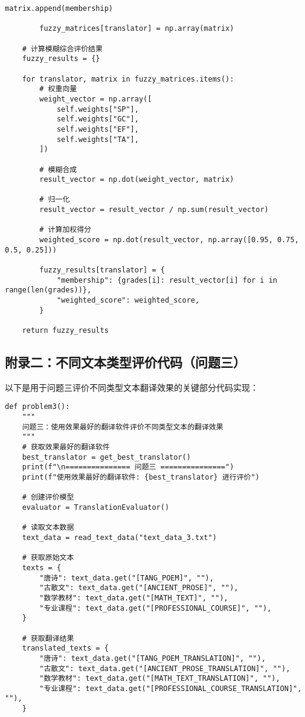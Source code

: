 \documentclass[bwprint]{cumcmthesis}
\begin{document}
\begin{appendices}
\begin{lstlisting}[style=pythonstyle, caption={模糊综合评价方法}]
            matrix.append(membership)

        fuzzy_matrices[translator] = np.array(matrix)

    # 计算模糊综合评价结果
    fuzzy_results = {}

    for translator, matrix in fuzzy_matrices.items():
        # 权重向量
        weight_vector = np.array([
            self.weights["SP"],
            self.weights["GC"],
            self.weights["EF"],
            self.weights["TA"],
        ])

        # 模糊合成
        result_vector = np.dot(weight_vector, matrix)

        # 归一化
        result_vector = result_vector / np.sum(result_vector)

        # 计算加权得分
        weighted_score = np.dot(result_vector, np.array([0.95, 0.75, 0.5, 0.25]))

        fuzzy_results[translator] = {
            "membership": {grades[i]: result_vector[i] for i in range(len(grades))},
            "weighted_score": weighted_score,
        }

    return fuzzy_results
\end{lstlisting}

\subsection{附录二：不同文本类型评价代码（问题三）}
以下是用于问题三评价不同类型文本翻译效果的关键部分代码实现：

\begin{lstlisting}[style=pythonstyle, caption={问题三主函数}]
def problem3():
    """
    问题三：使用效果最好的翻译软件评价不同类型文本的翻译效果
    """
    # 获取效果最好的翻译软件
    best_translator = get_best_translator()
    print(f"\n=============== 问题三 ===============")
    print(f"使用效果最好的翻译软件: {best_translator} 进行评价")

    # 创建评价模型
    evaluator = TranslationEvaluator()

    # 读取文本数据
    text_data = read_text_data("text_data_3.txt")

    # 获取原始文本
    texts = {
        "唐诗": text_data.get("[TANG_POEM]", ""),
        "古散文": text_data.get("[ANCIENT_PROSE]", ""),
        "数学教材": text_data.get("[MATH_TEXT]", ""),
        "专业课程": text_data.get("[PROFESSIONAL_COURSE]", ""),
    }

    # 获取翻译结果
    translated_texts = {
        "唐诗": text_data.get("[TANG_POEM_TRANSLATION]", ""),
        "古散文": text_data.get("[ANCIENT_PROSE_TRANSLATION]", ""),
        "数学教材": text_data.get("[MATH_TEXT_TRANSLATION]", ""),
        "专业课程": text_data.get("[PROFESSIONAL_COURSE_TRANSLATION]", ""),
    }


\end{lstlisting}
\end{appendices}
\end{document}
